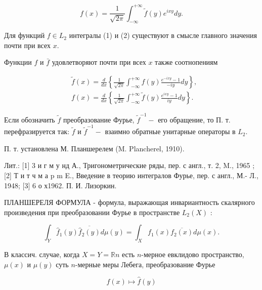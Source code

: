 \documentclass[10pt]{article}
\begin{document}
\[

f(x)=\frac{1}{\sqrt{2 \pi}} \int_{-\infty}^{+\infty} \tilde{f}(y) e^{i x y} d y .

\]



Для функций $f \in L_{2}$ интегралы (1) и (2) существуют в смысле главного значения почти при всех $x$.



Функции $f$ и $\bar{f}$ удовлетворяют почти при всех $x$ также соотнопениям



\[

\begin{aligned}

& \tilde{f}(x)=\frac{d}{d x}\left\{\frac{1}{\sqrt{2 \pi}} \int_{-\infty}^{+\infty} f(y) \frac{e^{-i x y}-1}{-i y} d y\right\}, \\

& f(x)=\frac{d}{d x}\left\{\frac{1}{\sqrt{2 \pi}} \int_{-\infty}^{+\infty} \tilde{f}(y) \frac{e^{i x y}-1}{i y} d y\right\} .

\end{aligned}

\]



Если обозначить $\tilde{f}$ преобразование Фурье, $\tilde{f}^{-1}-$ его обращение, то П. т. перефразируется так: $\tilde{f}$ и $\tilde{f}^{-1}-$ взаимно обратные унитарные операторы в $L_{2}$.



П. т. установлена М. Планшерелем (M. Plancherel, 1910).



Лит.: [1] 3 и г м у нд А., Тригонометрические ряды, пер. с англ., т. 2, M., 1965 ; [2] Т и т ч м а p m E., Введение в теорию интегралов Фурье, пер. с англ., М.- Л., 1948; [3] 6 о х1962. П. И. Лизоркин.



ПЛАНШЕРЕЛЯ ФОРМУЛА - формула, выражающая инвариантность скалярного произведения при преобразовании Фурье в пространстве $L_{2}(X)$ :



\[

\int_{Y} \hat{f}_{1}(y) \overline{\hat{f}_{2}(y)} d \mu(y)=\int_{X} f_{1}(x) \overline{f_{2}(x)} d \mu(x) .

\]



В классич. случае, когда $X=Y=\mathbb{R} n$ есть $n$-мерное евклидово пространство, $\mu(x)$ и $\mu(y)$ суть $n$-мерные меры Лебега, преобразование Фурье



\[

f(x) \mapsto \hat{f}(y)

\]
\end{document}
